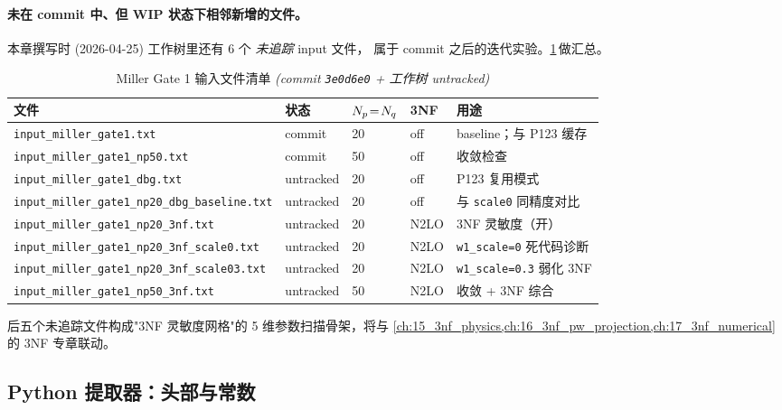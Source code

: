 \paragraph{未在 commit 中、但 WIP 状态下相邻新增的文件。}
本章撰写时 (2026-04-25) 工作树里还有 6 个 \emph{未追踪} input 文件，
属于 commit 之后的迭代实验。\cref{tab:ch14-input-inventory}\(\,\)做汇总。

\begin{table}[h]
\centering
\caption{Miller Gate 1 输入文件清单 \emph{(commit \texttt{3e0d6e0} + 工作树 untracked)}}
\label{tab:ch14-input-inventory}
\small
\begin{tabular}{p{4.6cm}p{2.4cm}p{1.2cm}p{1.6cm}p{3.6cm}}
\toprule
文件 & 状态 & \(N_p\!=\!N_q\) & 3NF & 用途 \\
\midrule
\texttt{input\_miller\_gate1.txt} & commit & 20 & off & baseline；与 P123 缓存\\
\texttt{input\_miller\_gate1\_np50.txt} & commit & 50 & off & 收敛检查 \\
\texttt{input\_miller\_gate1\_dbg.txt} & untracked & 20 & off & P123 复用模式\\
\texttt{input\_miller\_gate1\_np20\_dbg\_baseline.txt} & untracked & 20 & off & 与 \texttt{scale0} 同精度对比\\
\texttt{input\_miller\_gate1\_np20\_3nf.txt} & untracked & 20 & N2LO & 3NF 灵敏度（开） \\
\texttt{input\_miller\_gate1\_np20\_3nf\_scale0.txt} & untracked & 20 & N2LO & \texttt{w1\_scale=0} 死代码诊断 \\
\texttt{input\_miller\_gate1\_np20\_3nf\_scale03.txt} & untracked & 20 & N2LO & \texttt{w1\_scale=0.3} 弱化 3NF\\
\texttt{input\_miller\_gate1\_np50\_3nf.txt} & untracked & 50 & N2LO & 收敛 + 3NF 综合\\
\bottomrule
\end{tabular}
\end{table}

后五个未追踪文件构成"3NF 灵敏度网格"的 5 维参数扫描骨架，将与
\cref{ch:15_3nf_physics,ch:16_3nf_pw_projection,ch:17_3nf_numerical}\(\,\)
的 3NF 专章联动。

\subsection{Python 提取器：头部与常数}
\label{subsec:ch14-py-header}




